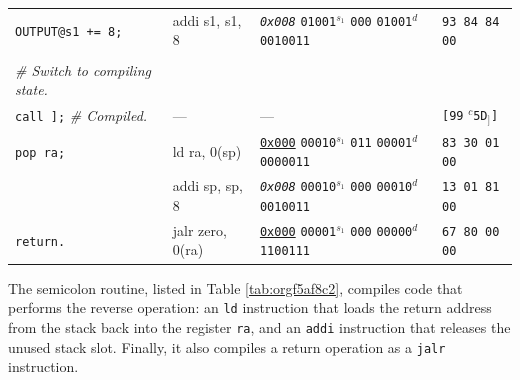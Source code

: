 \documentclass[a4paper,12pt,final]{article}
\begin{document}
\begin{table}[!htbp]
\begin{adjustwidth}{-1cm}{-1cm}
\begin{center}
\begin{tabular}{l|ll|l}
\texttt{OUTPUT@s1 += 8;} & addi s1, s1, 8 & \emph{\texttt{0x008}}                    \texttt{01001}​\(^{s_{1}}\) \texttt{000} \texttt{01001}​\(^{d}\)  \texttt{0010011} & \texttt{93 84 84 00}\\[0pt]
 &  &  & \\[0pt]
\emph{\# Switch to compiling state.} &  &  & \\[0pt]
\texttt{call ];}  \emph{\# Compiled.} & --- & --- & \texttt{[99} \(^{c}\)​\texttt{5D}​\(_{]}\)​\texttt{]}\\[0pt]
\texttt{pop ra;} & ld ra, 0(sp) & \uline{\texttt{0x000}}                    \texttt{00010}​\(^{s_{1}}\) \texttt{011} \texttt{00001}​\(^{d}\)  \texttt{0000011} & \texttt{83 30 01 00}\\[0pt]
 & addi sp, sp, 8 & \emph{\texttt{0x008}}                    \texttt{00010}​\(^{s_{1}}\) \texttt{000} \texttt{00010}​\(^{d}\)  \texttt{0010011} & \texttt{13 01 81 00}\\[0pt]
\texttt{return.} & jalr zero, 0(ra) & \uline{\texttt{0x000}}                    \texttt{00001}​\(^{s_{1}}\) \texttt{000} \texttt{00000}​\(^{d}\)  \texttt{1100111} & \texttt{67 80 00 00}\\[0pt]
\end{tabular}

\end{center}
\normalsize \end{adjustwidth} \end{table} \vspace{0}

The semicolon routine, listed in Table \ref{tab:orgf5af8c2},
compiles code that performs the reverse operation: an \texttt{ld} instruction
that loads the return address from the stack back into the register
\texttt{ra}, and an \texttt{addi} instruction that releases the unused stack slot.
Finally, it also compiles a return operation as a \texttt{jalr} instruction.
\end{document}
